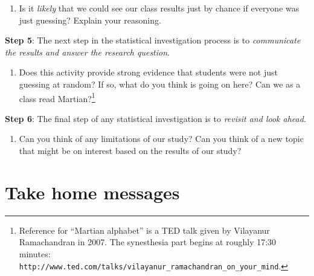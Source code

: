 \documentclass[
]{report}
\providecommand{\tightlist}{%
  \setlength{\itemsep}{0pt}\setlength{\parskip}{0pt}}
\begin{document}
\vspace{.5in}

\begin{enumerate}
\def\labelenumi{\arabic{enumi}.}
\setcounter{enumi}{16}
\tightlist
\item
  Is it \emph{likely} that we could see our class results just by chance if everyone was just guessing? Explain your reasoning.
\end{enumerate}

\vspace{.5in}

\newpage

\textbf{Step 5}: The next step in the statistical investigation process is to \emph{communicate the results and answer the research question}.

\begin{enumerate}
\def\labelenumi{\arabic{enumi}.}
\setcounter{enumi}{17}
\tightlist
\item
  Does this activity provide strong evidence that students were not just guessing at random? If so, what do you think is going on here? Can we as a class read Martian?\footnote{Reference for ``Martian alphabet'' is a TED talk given by Vilayanur Ramachandran in 2007. The synesthesia part begins at roughly 17:30 minutes: \texttt{http://www.ted.com/talks/vilayanur\_ramachandran\_on\_your\_mind}.}
\end{enumerate}

\vspace{1in}

\textbf{Step 6}: The final step of any statistical investigation is to \emph{revisit and look ahead}.

\begin{enumerate}
\def\labelenumi{\arabic{enumi}.}
\setcounter{enumi}{18}
\tightlist
\item
  Can you think of any limitations of our study? Can you think of a new topic that might be on interest based on the results of our study?
\end{enumerate}

\vspace{1in}

\hypertarget{take-home-messages}{%
\section{Take home messages}\label{take-home-messages}}
\end{document}
